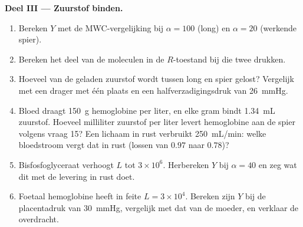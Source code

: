 \begin{problem}
\medskip
\noindent\textbf{Deel III --- Zuurstof binden.}
\begin{enumerate}[resume]
  \item Bereken $Y$ met de MWC-vergelijking bij $\alpha = 100$ (long)
        en $\alpha = 20$ (werkende spier).
  \item Bereken het deel van de moleculen in de $R$-toestand bij die
        twee drukken.
  \item Hoeveel van de geladen zuurstof wordt tussen long en spier
        gelost? Vergelijk met een drager met één plaats en een
        halfverzadigingsdruk van \qty{26}{mmHg}.
  \item Bloed draagt \qty{150}{g} hemoglobine per liter, en elke gram
        bindt \qty{1.34}{mL} zuurstof. Hoeveel milliliter zuurstof per
        liter levert hemoglobine aan de spier volgens vraag 15? Een
        lichaam in rust verbruikt \qty{250}{mL/min}: welke
        bloedstroom vergt dat in rust (lossen van $0.97$ naar $0.78$)?
  \item Bisfosfoglyceraat verhoogt $L$ tot $3\times 10^{6}$. Herbereken
        $Y$ bij $\alpha = 40$ en zeg wat dit met de levering in rust
        doet.
  \item Foetaal hemoglobine heeft in feite $L = 3\times 10^{4}$.
        Bereken zijn $Y$ bij de placentadruk van \qty{30}{mmHg},
        vergelijk met dat van de moeder, en verklaar de overdracht.
\end{enumerate}


\end{problem}
